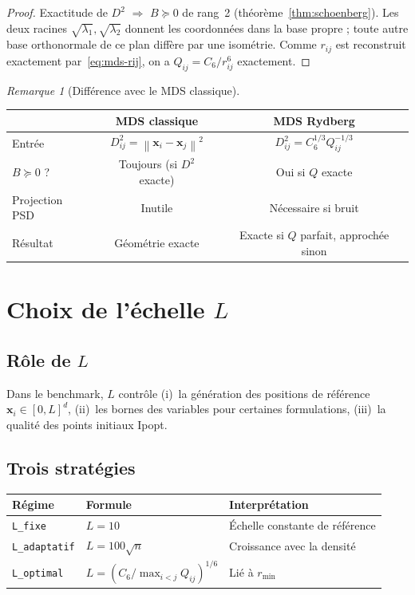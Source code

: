 \documentclass[11pt,a4paper]{article}
\theoremstyle{definition}
\theoremstyle{remark}
\newtheorem{remark}[theorem]{Remarque}
\newcommand{\norm}[1]{\left\|#1\right\|}
\newcommand{\cSix}{C_6}
\begin{document}
\begin{proof}
Exactitude de $D^2$ $\Rightarrow$ $B \succeq 0$ de rang~2
(théorème~\ref{thm:schoenberg}). Les deux racines $\sqrt{\lambda_1},\sqrt{\lambda_2}$
donnent les coordonnées dans la base propre ; toute autre base orthonormale
de ce plan diffère par une isométrie. Comme $r_{ij}$ est reconstruit
exactement par~\eqref{eq:mds-rij}, on a $Q_{ij}=\cSix/r_{ij}^6$ exactement.
\end{proof}

\begin{remark}[Différence avec le MDS classique]
\begin{center}
\small
\begin{tabular}{@{}lcc@{}}
  \toprule
  & MDS classique & MDS Rydberg \\
  \midrule
  Entrée & $D^2_{ij}=\norm{\mathbf{x}_i-\mathbf{x}_j}^2$ & $D^2_{ij}=\cSix^{1/3}Q_{ij}^{-1/3}$ \\
  $B \succeq 0$ ? & Toujours (si $D^2$ exacte) & Oui si $Q$ exacte \\
  Projection PSD & Inutile & Nécessaire si bruit \\
  Résultat & Géométrie exacte & Exacte si $Q$ parfait, approchée sinon \\
  \bottomrule
\end{tabular}
\end{center}
\end{remark}

\section{Choix de l'échelle \texorpdfstring{$L$}{L}}
\label{sec:L}

\subsection{Rôle de \texorpdfstring{$L$}{L}}
Dans le benchmark, $L$ contrôle (i)~la génération des positions de référence
$\mathbf{x}_i \in [0,L]^d$, (ii)~les bornes des variables pour certaines
formulations, (iii)~la qualité des points initiaux Ipopt.

\subsection{Trois stratégies}
\begin{center}
\begin{tabular}{@{}lll@{}}
  \toprule
  Régime & Formule & Interprétation \\
  \midrule
  \texttt{L\_fixe}      & $L = 10$ & Échelle constante de référence \\
  \texttt{L\_adaptatif} & $L = 100\sqrt{n}$ & Croissance avec la densité \\
  \texttt{L\_optimal}   & $L = (\cSix/\max_{i<j} Q_{ij})^{1/6}$ & Lié à $r_{\min}$ \\
  \bottomrule
\end{tabular}
\end{center}
\end{document}
